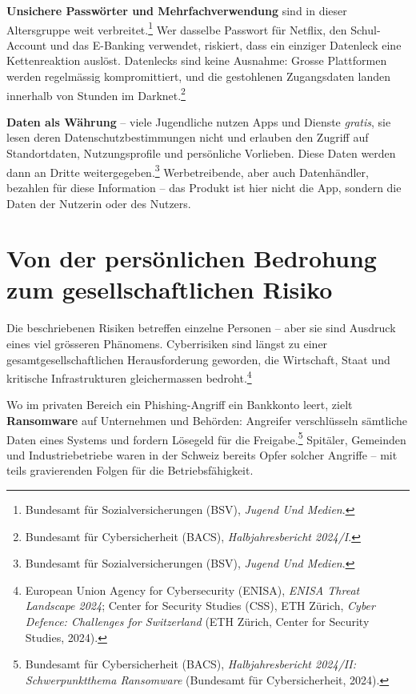 \documentclass[
  nswissgerman,
  a4paper,
  DIV=11,
  numbers=noendperiod,
  ngerman]{scrreprt}
\begin{document}
\textbf{Unsichere Passwörter und Mehrfachverwendung} sind in dieser
Altersgruppe weit verbreitet.\footnote{Bundesamt für
  Sozialversicherungen (BSV), \emph{Jugend Und Medien}.} Wer dasselbe
Passwort für Netflix, den Schul-Account und das E-Banking verwendet,
riskiert, dass ein einziger Datenleck eine Kettenreaktion auslöst.
Datenlecks sind keine Ausnahme: Grosse Plattformen werden regelmässig
kompromittiert, und die gestohlenen Zugangsdaten landen innerhalb von
Stunden im Darknet.\footnote{Bundesamt für Cybersicherheit (BACS),
  \emph{Halbjahresbericht 2024/{I}}.}

\textbf{Daten als Währung} -- viele Jugendliche nutzen Apps und Dienste
\emph{gratis}, sie lesen deren Datenschutzbestimmungen nicht und
erlauben den Zugriff auf Standortdaten, Nutzungsprofile und persönliche
Vorlieben. Diese Daten werden dann an Dritte weitergegeben.\footnote{Bundesamt
  für Sozialversicherungen (BSV), \emph{Jugend Und Medien}.}
Werbetreibende, aber auch Datenhändler, bezahlen für diese Information
-- das Produkt ist hier nicht die App, sondern die Daten der Nutzerin
oder des Nutzers.

\section{Von der persönlichen Bedrohung zum gesellschaftlichen
Risiko}\label{von-der-persuxf6nlichen-bedrohung-zum-gesellschaftlichen-risiko}

Die beschriebenen Risiken betreffen einzelne Personen -- aber sie sind
Ausdruck eines viel grösseren Phänomens. Cyberrisiken sind längst zu
einer gesamtgesellschaftlichen Herausforderung geworden, die Wirtschaft,
Staat und kritische Infrastrukturen gleichermassen bedroht.\footnote{European
  Union Agency for Cybersecurity (ENISA), \emph{{ENISA} Threat Landscape
  2024}; Center for Security Studies (CSS), ETH Zürich, \emph{Cyber
  Defence: {Challenges} for Switzerland} (ETH Zürich, Center for
  Security Studies, 2024).}

Wo im privaten Bereich ein Phishing-Angriff ein Bankkonto leert, zielt
\textbf{Ransomware} auf Unternehmen und Behörden: Angreifer
verschlüsseln sämtliche Daten eines Systems und fordern Lösegeld für die
Freigabe.\footnote{Bundesamt für Cybersicherheit (BACS),
  \emph{Halbjahresbericht 2024/{II}: {Schwerpunktthema} Ransomware}
  (Bundesamt für Cybersicherheit, 2024).} Spitäler, Gemeinden und
Industriebetriebe waren in der Schweiz bereits Opfer solcher Angriffe --
mit teils gravierenden Folgen für die Betriebsfähigkeit.
\end{document}
